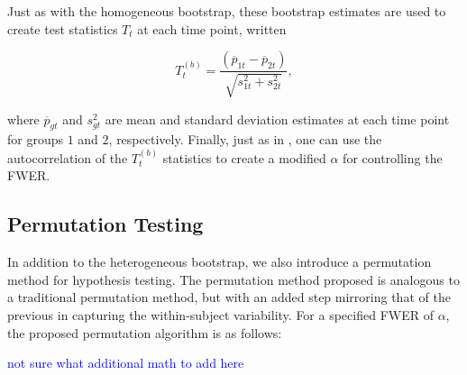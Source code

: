 \documentclass{article}
\providecommand{\cn}[1]{\textcolor{blue}{#1}}
\begin{document}
Just as with the homogeneous bootstrap, these bootstrap estimates are used to create test statistics $T_t$ at each time point, written

\begin{equation}
T_t^{(b)} = \frac{(\overline{p}_{1t} - \overline{p}_{2t})}{\sqrt{s_{1t}^2 + s_{2t}^2}},
\end{equation}

where $\overline{p}_{gt}$ and $s_{gt}^2$ are mean and standard deviation estimates at each time point for groups $1$ and $2$, respectively. Finally, just as in \citet{oleson2017detecting}, one can use the autocorrelation of the $T_t^{(b)}$ statistics to create a modified $\alpha$ for controlling the FWER.



\subsection{Permutation Testing}

In addition to the heterogeneous bootstrap, we also introduce a permutation method for hypothesis testing. The permutation method proposed is analogous to a traditional permutation method, but with an added step mirroring that of the previous in capturing the within-subject variability. For a specified FWER of $\alpha$, the proposed permutation algorithm is as follows:

\cn{not sure what additional math to add here}
\end{document}
